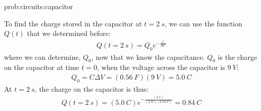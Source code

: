 \begin{solutionParts}{prob:circuits:capacitor}
{\item To find the charge stored in the capacitor at $t = \SI{2}{s}$, we can use the function $Q(t)$ that we determined before:
\begin{align*}
Q(t=\SI{2}{s})=Q_0 e^{-\frac{t}{RC}}
\end{align*}
where we can determine, $Q_0$, now that we know the capacitance. $Q_0$ is the charge on the capacitor at time $t=0$, when the voltage across the capacitor is $\SI{9}{V}$:
\begin{align*}
Q_0=C\Delta V = (\SI{0.56}{F})(\SI{9}{V})=\SI{5.0}{C}
\end{align*}
At $t = \SI{2}{s}$, the charge on the capacitor is thus:
\begin{align*}
Q(t = \SI{2}{s})=(\SI{5.0}{C})e^{-\frac{(\SI{2}{s})}{(\SI{2}{\Omega})(\SI{0.56}{F})}}=\SI{0.84}{C}
\end{align*}
}
\end{solutionParts}

